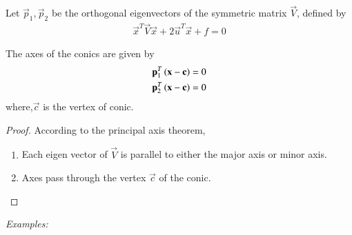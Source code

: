 \begin{lemma}
    Let $\vec{p}_1, \vec{p}_2$ be the orthogonal eigenvectors of the symmetric matrix $\vec{V}$, defined by 
    \begin{align}
        \vec{x}^T\vec{V}\vec{x} + 2\vec{u}^T\vec{x} + f =0
    \end{align}
    
The axes of the conics are given by 
\begin{align}
    \mathbf{p}_1^T\left(\mathbf{x}-\mathbf{c}\right) &= 0
    \\
    \mathbf{p}_2^T\left(\mathbf{x}-\mathbf{c}\right) &= 0
\end{align}
where,$\vec{c}$ is the vertex of conic.
\end{lemma}

\begin{proof}
According to the principal axis theorem,
\begin{enumerate}
    \item Each eigen vector of $\vec{V}$ is parallel to either the major axis or minor axis.
    \item Axes pass through the vertex $\vec{c}$ of the conic.
\end{enumerate}

\end{proof}

{\em Examples: }

